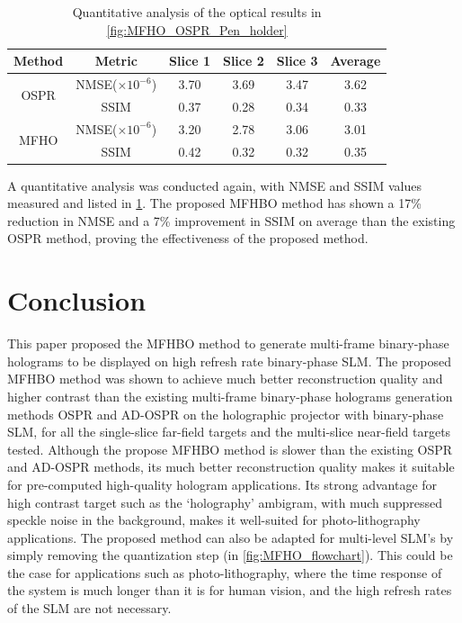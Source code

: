 	\begin{table}[H]
	\centering
	\begin{tabular}{|c|c|c|c|c|c|}
	\hline
	\textbf{Method} & \textbf{Metric} & \textbf{Slice 1} & \textbf{Slice 2} & \textbf{Slice 3} & \textbf{Average} \\ \hline
	\multirow{2}{*}{OSPR} & NMSE($\times 10^{-6}$) & 3.70 & 3.69 & 3.47 & 3.62 \\ \cline{2-6} 
						  & SSIM                   & 0.37 & 0.28 & 0.34 & 0.33 \\ \hline
	\multirow{2}{*}{MFHO} & NMSE($\times 10^{-6}$) & 3.20 & 2.78 & 3.06 & 3.01 \\ \cline{2-6} 
						  & SSIM                   & 0.42 & 0.32 & 0.32 & 0.35 \\ \hline
	\end{tabular}
	\caption{Quantitative analysis of the optical results in \cref{fig:MFHO_OSPR_Pen_holder}}
	\label{tab:quant_MFHO_Pen_holder}
	\end{table}
	
	A quantitative analysis was conducted again, with NMSE and SSIM values measured and listed in \cref{tab:quant_MFHO_Pen_holder}. The proposed MFHBO method has shown a 17\% reduction in NMSE and a 7\% improvement in SSIM on average than the existing OSPR method, proving the effectiveness of the proposed method. 
	
	
\section{Conclusion}
	This paper proposed the MFHBO method to generate multi-frame binary-phase holograms to be displayed on high refresh rate binary-phase SLM. The proposed MFHBO method was shown to achieve much better reconstruction quality and higher contrast than the existing multi-frame binary-phase holograms generation methods OSPR \cite{Cable2004} and AD-OSPR \cite{Kaczorowski2016} on the holographic projector with binary-phase SLM, for all the single-slice far-field targets and the multi-slice near-field targets tested. Although the propose MFHBO method is slower than the existing OSPR and AD-OSPR methods, its much better reconstruction quality makes it suitable for pre-computed high-quality hologram applications. Its strong advantage for high contrast target such as the `holography' ambigram, with much suppressed speckle noise in the background, makes it well-suited for photo-lithography applications. The proposed method can also be adapted for multi-level SLM's by simply removing the quantization step (in \cref{fig:MFHO_flowchart}). This could be the case for applications such as photo-lithography, where the time response of the system is much longer than it is for human vision, and the high refresh rates of the SLM are not necessary.
	